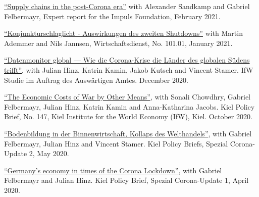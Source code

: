 \documentclass{article}
\begin{document}
\begin{minipage}[t]{0.8\textwidth}
    \href{https://www.ifw-kiel.de/publications/policy-papers/2021/supply-chains-in-the-post-corona-era-in-german-15841/}{``Supply chains in the post-Corona era''} with Alexander Sandkamp and Gabriel Felbermayr, Expert report for the Impuls Foundation, February 2021. \par
    \href{https://www.wirtschaftsdienst.eu/inhalt/jahr/2021/heft/1/beitrag/auswirkungen-des-zweiten-shutdowns.html}{``Konjunkturschlaglicht - Auswirkungen des zweiten Shutdowns''} with Martin Ademmer and Nils Jannsen, Wirtschaftsdienst, No. 101.01, January 2021. \par
    \href{https://www.ifw-kiel.de/de/publikationen/policy-papers/2021/corona-krise-datenmonitor-global-0/}{``Datenmonitor global — Wie die Corona-Krise die Länder des globalen Südens trifft''}, with Julian Hinz, Katrin Kamin, Jakob Kutsch and Vincent Stamer. IfW Studie im Auftrag des Auswärtigen Amtes. December 2020. \par
\end{minipage}
\medskip

\begin{minipage}[t]{0.12\textwidth}
\hspace{0mm}
\end{minipage}
\hspace{5mm}
\begin{minipage}[t]{0.8\textwidth}
    \href{https://www.ifw-kiel.de/publications/kiel-policy-briefs/2020/the-economic-costs-of-war-by-other-means-15301/}{``The Economic Costs of War by Other Means''}, with Sonali Chowdhry, Gabriel Felbermayr, Julian Hinz, Katrin Kamin and Anna-Katharina Jacobs. Kiel Policy Brief, No. 147, Kiel Institute for the World Economy (IfW), Kiel. October 2020. \par
    \href{https://www.ifw-kiel.de/de/publikationen/kiel-policy-briefs/spezial/bodenbildung-in-der-binnenwirtschaft-kollaps-des-welthandels-14242/}{``Bodenbildung in der Binnenwirtschaft, Kollaps des Welthandels''}, with Gabriel Felbermayr, Julian Hinz and Vincent Stamer. Kiel Policy Briefs, Spezial Corona-Update 2, May 2020. \par
    \href{https://www.ifw-kiel.de/publications/kiel-policy-briefs/special-edition/germanys-economy-in-times-of-the-corona-lockdown-14127/}{``Germany’s economy in times of the Corona Lockdown''}, with Gabriel Felbermayr and Julian Hinz. Kiel Policy Brief, Spezial Corona-Update 1, April 2020.
\end{minipage}
\medskip

\end{document}
